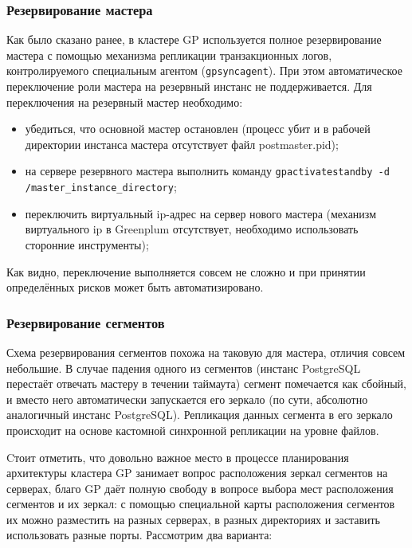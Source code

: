 \subsubsection{Резервирование мастера}

Как было сказано ранее, в кластере GP используется полное резервирование мастера с помощью механизма репликации транзакционных логов, контролируемого специальным агентом (\lstinline!gpsyncagent!). При этом автоматическое переключение роли мастера на резервный инстанс не поддерживается. Для переключения на резервный мастер необходимо:

\begin{itemize}
  \item убедиться, что основной мастер остановлен (процесс убит и в рабочей директории инстанса мастера отсутствует файл postmaster.pid);
  \item на сервере резервного мастера выполнить команду \lstinline!gpactivatestandby -d /master_instance_directory!;
  \item переключить виртуальный ip-адрес на сервер нового мастера (механизм виртуального ip в Greenplum отсутствует, необходимо использовать сторонние инструменты);
\end{itemize}

Как видно, переключение выполняется совсем не сложно и при принятии определённых рисков может быть автоматизировано.


\subsubsection{Резервирование сегментов}

Схема резервирования сегментов похожа на таковую для мастера, отличия совсем небольшие. В случае падения одного из сегментов (инстанс PostgreSQL перестаёт отвечать мастеру в течении таймаута) сегмент помечается как сбойный, и вместо него автоматически запускается его зеркало (по сути, абсолютно аналогичный инстанс PostgreSQL). Репликация данных сегмента в его зеркало происходит на основе кастомной синхронной репликации на уровне файлов.

Cтоит отметить, что довольно важное место в процессе планирования архитектуры кластера GP занимает вопрос расположения зеркал сегментов на серверах, благо GP даёт полную свободу в вопросе выбора мест расположения сегментов и их зеркал: с помощью специальной карты расположения сегментов их можно разместить на разных серверах, в разных директориях и заставить использовать разные порты. Рассмотрим два варианта:

